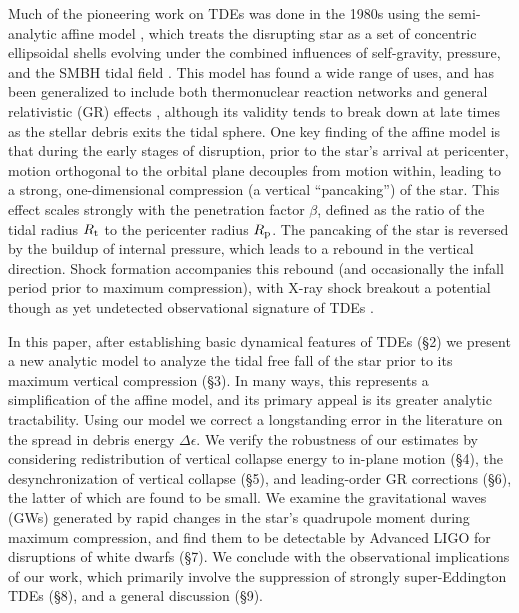 \documentclass[useAMS, twocolumn, usenatbib]{mn2e}
\begin{document}
Much of the pioneering work on TDEs was done in the 1980s using the semi-analytic affine model \citep[hereafter CL83]{CarterLuminet83}, which treats the disrupting star as a set of concentric ellipsoidal shells evolving under the combined influences of self-gravity, pressure, and the SMBH tidal field \citep{CarterLuminet85, LuminetCarter86}.  This model has found a wide range of uses, and has been generalized to include both thermonuclear reaction networks \citep{LuminetPichon89} and general relativistic (GR) effects \citep{LuminetMarck85}, although its validity tends to break down at late times as the stellar debris exits the tidal sphere.  One key finding of the affine model is that during the early stages of disruption, prior to the star's arrival at pericenter, motion orthogonal to the orbital plane decouples from motion within, leading to a strong, one-dimensional compression (a vertical ``pancaking'') of the star.  This effect scales strongly with the penetration factor $\beta$, defined as the ratio of the tidal radius $R_{\rm t}$ to the pericenter radius $R_{\rm p}$.  The pancaking of the star is reversed by the buildup of internal pressure, which leads to a rebound in the vertical direction.  Shock formation accompanies this rebound (and occasionally the infall period prior to maximum compression), with X-ray shock breakout a potential though as yet undetected observational signature of TDEs \citep{Kobayashi+04, Guillochon+09}.

In this paper, after establishing basic dynamical features of TDEs (\S 2) we present a new analytic model to analyze the tidal free fall of the star prior to its maximum vertical compression (\S 3).  In many ways, this represents a simplification of the affine model, and its primary appeal is its greater analytic tractability.  Using our model we correct a longstanding error in the literature on the spread in debris energy $\Delta \epsilon$.  We verify the robustness of our estimates by considering redistribution of vertical collapse energy to in-plane motion (\S 4), the desynchronization of vertical collapse (\S 5), and leading-order GR corrections (\S 6), the latter of which are found to be small.  We examine the gravitational waves (GWs) generated by rapid changes in the star's quadrupole moment during maximum compression, and find them to be detectable by Advanced LIGO for disruptions of white dwarfs (\S 7).  We conclude with the observational implications of our work, which primarily involve the suppression of strongly super-Eddington TDEs (\S 8), and a general discussion (\S 9).
\end{document}
